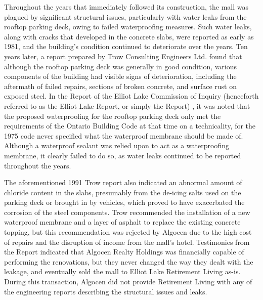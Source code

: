 \documentclass[12pt]{article}
\begin{document}
Throughout the years that immediately followed its construction, the mall was plagued by significant structural issues, particularly with water leaks from the rooftop parking deck, owing to failed waterproofing measures. Such water leaks, along with cracks that developed in the concrete slabs, were reported as early as 1981, and the building's condition continued to deteriorate over the years. Ten years later, a report prepared by Trow Consulting Engineers Ltd. found that although the rooftop parking deck was generally in good condition, various components of the building had visible signs of deterioration, including the aftermath of failed repairs, sections of broken concrete, and surface rust on exposed steel. In the Report of the Elliot Lake Commission of Inquiry (henceforth referred to as the Elliot Lake Report, or simply the Report) \cite{AlgoLakeReport1}, it was noted that the proposed waterproofing for the rooftop parking deck only met the requirements of the Ontario Building Code at that time on a technicality, for the 1975 code never specified what the waterproof membrane should be made of. Although a waterproof sealant was relied upon to act as a waterproofing membrane, it clearly failed to do so, as water leaks continued to be reported throughout the years. 

The aforementioned 1991 Trow report also indicated an abnormal amount of chloride content in the slabs, presumably from the de-icing salts used on the parking deck or brought in by vehicles, which proved to have exacerbated the corrosion of the steel components. Trow recommended the installation of a new waterproof membrane and a layer of asphalt to replace the existing concrete topping, but this recommendation was rejected by Algocen due to the high cost of repairs and the disruption of income from the mall's hotel. Testimonies from the Report indicated that Algocen Realty Holdings was financially capable of performing the renovations, but they never changed the way they dealt with the leakage, and eventually sold the mall to Elliot Lake Retirement Living as-is. During this transaction, Algocen did not provide Retirement Living with any of the engineering reports describing the structural issues and leaks.
\end{document}
